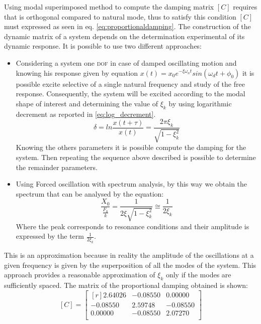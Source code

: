 Using modal superimposed method to compute the damping matrix \([C]\) requires 
that is orthogonal compared to natural mode, thus to satisfy this condition 
\([C]\) must expressed as seen in eq. \eqref{eq:proportionaldamping}.
The construction of the dynamic matrix of a system depends on the 
determination experimental of its dynamic response.
It is possible to use two different approaches:
\begin{itemize}
\item Considering a system one \textsc{dof} in case of damped oscillating 
motion and knowing his response given by equation
\(x(t) = x_{0} e^{-\xi\omega_{n}t}sin(\omega_dt+\phi_0)\) it is possible excite 
selective of a single natural frequency and study of the free response. 
Consequently, the system will be excited according to the modal shape 
of interest and determining the value of \(\xi_{k}\) by using logarithmic 
decrement as reported 
in \eqref{eq:log_decrement}.
\begin{equation}
\label{eq:log_decrement}
\delta = ln\frac{x(t+\tau)}{x(t)} = \frac{2\pi\xi_{k}}{\sqrt{1-\xi_{k}^2}}
\end{equation}
Knowing the others parameters it is possible compute the damping for the system. 
Then repeating the sequence above described is possible to determine the remainder
 parameters. 
\item Using Forced oscillation with spectrum analysis, by this way we obtain 
the spectrum that can be analysed by the equation:
\begin{equation}
\label{eq:analysis_spectrum}
\frac{X_{0}}{\frac{F_{0}}{k}} = \frac{1}{2\xi\sqrt{1-\xi^2_{k}}} \cong \frac{1}{2\xi_{k}}
\end{equation}
Where the peak corresponds to resonance conditions and their amplitude is 
expressed by the term \(\frac{1}{2\xi_{k}}\).
\end{itemize}
This is an approximation because in reality the amplitude of the oscillations 
at a given frequency is given by the superposition of all the modes of the 
system. This approach provides a reasonable approximation of \(\xi_{k}\) only 
if the modes are sufficiently spaced.
The matrix of the proportional damping obtained is shown:
\begin{equation}
\label{eq:c-matrix}
	[C] =
	\begin{bmatrix*}[r]
		 2.64026		&	-0.08550		 & 	 0.00000 	\\
		-0.08550 	&	 2.59748		 &	-0.08550		\\
		 0.00000 	&	-0.08550		 &	 2.07270		\\
	\end{bmatrix*}
\end{equation}
%
